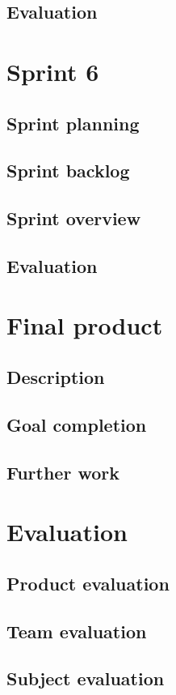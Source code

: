 \documentclass[11pt,a4paper,titlepage,oneside]{report}
\begin{document}
\section{Evaluation}

\chapter{Sprint 6}
\section{Sprint planning}
\section{Sprint backlog}
\section{Sprint overview}
\section{Evaluation}

\chapter{Final product}
\section{Description}
\section{Goal completion}
\section{Further work}

\chapter{Evaluation}
\section{Product evaluation}
\section{Team evaluation}
\section{Subject evaluation}



\begin{flushleft}
	
\end{flushleft}

\appendix
\end{document}
